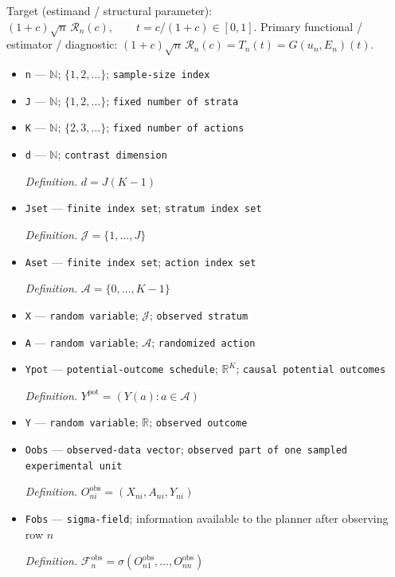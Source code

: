 \documentclass{article}
\begin{document}
Target (estimand / structural parameter): \((1+c)\sqrt n\,\mathscr R_n(c),\qquad t=c/(1+c)\in[0,1]\).
Primary functional / estimator / diagnostic: \((1+c)\sqrt n\,\mathscr R_n(c)=T_n(t)=G(u_n,E_n)(t)\).
\begin{itemize}
  \item \texttt{n} --- \(\mathbb N\); \(\{1,2,\ldots\}\); \texttt{sample-\allowbreak{}size index}
  \item \texttt{J} --- \(\mathbb N\); \(\{1,2,\ldots\}\); \texttt{fixed number of strata}
  \item \texttt{K} --- \(\mathbb N\); \(\{2,3,\ldots\}\); \texttt{fixed number of actions}
  \item \texttt{d} --- \(\mathbb N\); \texttt{contrast dimension}
  \par\smallskip\noindent\emph{Definition.} \(d=J(K-1)\)
  \item \texttt{Jset} --- \texttt{finite index set}; \texttt{stratum index set}
  \par\smallskip\noindent\emph{Definition.} \(\mathcal J=\{1,\ldots,J\}\)
  \item \texttt{Aset} --- \texttt{finite index set}; \texttt{action index set}
  \par\smallskip\noindent\emph{Definition.} \(\mathcal A=\{0,\ldots,K-1\}\)
  \item \texttt{X} --- \texttt{random variable}; \(\mathcal J\); \texttt{observed stratum}
  \item \texttt{A} --- \texttt{random variable}; \(\mathcal A\); \texttt{randomized action}
  \item \texttt{Ypot} --- \texttt{potential-\allowbreak{}outcome schedule}; \(\mathbb R^{K}\); \texttt{causal potential outcomes}
  \par\smallskip\noindent\emph{Definition.} \(Y^{\mathrm{pot}}=(Y(a):a\in\mathcal A)\)
  \item \texttt{Y} --- \texttt{random variable}; \(\mathbb R\); \texttt{observed outcome}
  \item \texttt{Oobs} --- \texttt{observed-\allowbreak{}data vector}; \texttt{observed part of one sampled experimental unit}
  \par\smallskip\noindent\emph{Definition.} \(O^{\mathrm{obs}}_{ni}=(X_{ni},A_{ni},Y_{ni})\)
  \item \texttt{Fobs} --- \texttt{sigma-\allowbreak{}field}; information available to the planner after observing row \(n\)
  \par\smallskip\noindent\emph{Definition.} \(\mathcal F_n^{\mathrm{obs}}=\sigma(O^{\mathrm{obs}}_{n1},\ldots,O^{\mathrm{obs}}_{nn})\)

\end{itemize}
\end{document}
